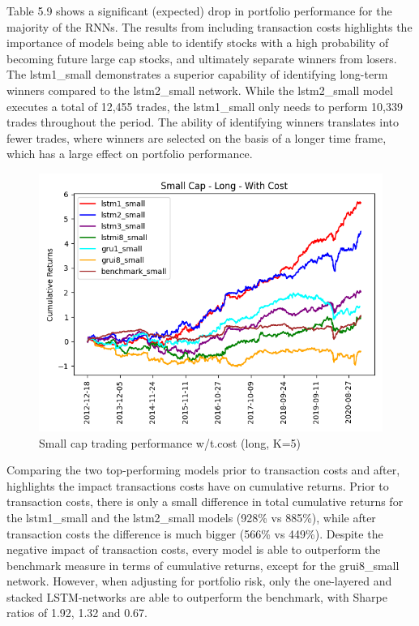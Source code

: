 \indent\newline 
Table 5.9 shows a significant (expected) drop in portfolio performance for the majority of the RNNs. The results from including transaction costs highlights the importance of models being able to identify stocks with a high probability of becoming future large cap stocks, and ultimately separate winners from losers. The lstm1\_small demonstrates a superior capability of identifying long-term winners compared to the lstm2\_small network. While the lstm2\_small model executes a total of 12,455 trades, the lstm1\_small only needs to perform 10,339 trades throughout the period. The ability of identifying winners translates into fewer trades, where winners are selected on the basis of a longer time frame, which has a large effect on portfolio performance.
\indent\newline 
\begin{figure}[H]
\centering
\includegraphics [scale=0.60,angle=360]{figures/cumulative_small_cap_return_with_cost.png}
\caption{Small cap trading performance w/t.cost (long, K=5)}
\label{fig:smallcost}
\end{figure}
\indent\newline 
Comparing the two top-performing models prior to transaction costs and after, highlights the impact transactions costs have on cumulative returns. Prior to transaction costs, there is only a small difference in total cumulative returns for the lstm1\_small and the lstm2\_small models (928\% vs 885\%), while after transaction costs the difference is much bigger (566\% vs 449\%). Despite the negative impact of transaction costs, every model is able to outperform the benchmark measure in terms of cumulative returns, except for the grui8\_small network. However, when adjusting for portfolio risk, only the one-layered and stacked LSTM-networks are able to outperform the benchmark, with Sharpe ratios of 1.92, 1.32 and 0.67.    

